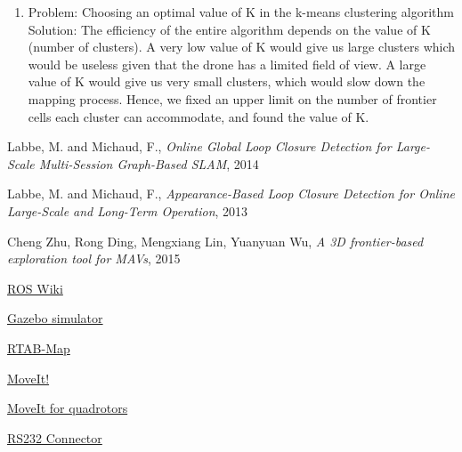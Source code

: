 \documentclass[a4paper,12pt,oneside]{book}
\begin{document}
\begin{itemize}
\begin{enumerate}
			\item Problem: Choosing an optimal value of K in the k-means clustering algorithm \\
			Solution: The efficiency of the entire algorithm depends on the value of K (number of clusters). A very low value of K would give us large clusters which would be useless given that the drone has a limited field of view. A large value of K would give us very small clusters, which would slow down the mapping process. Hence, we fixed an upper limit on the number of frontier cells each cluster can accommodate, and found the value of K.
		\end{enumerate}
\end{itemize}

\begin{thebibliography}{li}

Labbe, M. and Michaud, F.,
{\em Online Global Loop Closure Detection for Large-Scale Multi-Session Graph-Based SLAM},
2014

Labbe, M. and Michaud, F.,
{\em Appearance-Based Loop Closure Detection for Online Large-Scale and Long-Term Operation},
2013

\bibitem{}
Cheng Zhu, Rong Ding, Mengxiang Lin, Yuanyuan Wu,
{\em A 3D frontier-based exploration tool for MAVs},
2015

\bibitem{}
\href{http://wiki.ros.org}{ROS Wiki}

\bibitem{}
\href{http://gazebosim.org/}{Gazebo simulator}

\bibitem{}
\href{https://introlab.github.io/rtabmap/}{RTAB-Map}

\bibitem{}
\href{http://moveit.ros.org/}{MoveIt!}

\bibitem{}
\href{https://www.wilselby.com/research/ros-integration/3d-mapping-navigation/}{MoveIt for quadrotors}

\bibitem{}
\href{http://www.sealevel.com/store/media/catalog/product/cache/1/image/9df78eab33525d08d6e5fb8d27136e95/d/b/db9m-rs232-pinout.jpg}{RS232 Connector}

\end{thebibliography}
\end{document}
